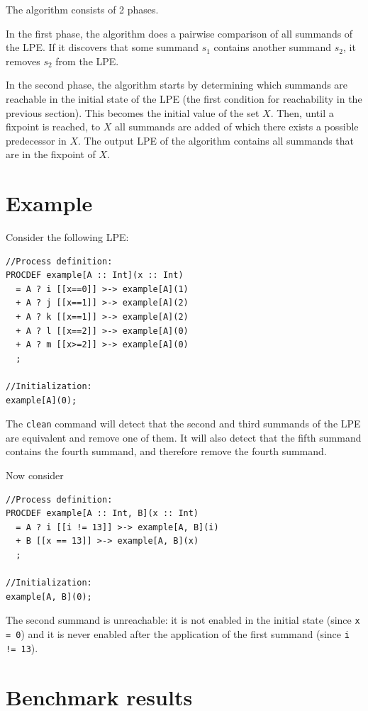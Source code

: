 The algorithm consists of 2 phases.

In the first phase, the algorithm does a pairwise comparison of all summands of the LPE.
If it discovers that some summand $s_1$ contains another summand $s_2$, it removes $s_2$ from the LPE.

In the second phase, the algorithm starts by determining which summands are reachable in the initial state of the LPE (the first condition for reachability in the previous section).
This becomes the initial value of the set $X$.
Then, until a fixpoint is reached, to $X$ all summands are added of which there exists a possible predecessor in $X$.
The output LPE of the algorithm contains all summands that are in the fixpoint of $X$.

\section{Example}

Consider the following LPE:

\begin{lstlisting}
//Process definition:
PROCDEF example[A :: Int](x :: Int)
  = A ? i [[x==0]] >-> example[A](1)
  + A ? j [[x==1]] >-> example[A](2)
  + A ? k [[x==1]] >-> example[A](2)
  + A ? l [[x==2]] >-> example[A](0)
  + A ? m [[x>=2]] >-> example[A](0)
  ;

//Initialization:
example[A](0);
\end{lstlisting}

The \texttt{clean} command will detect that the second and third summands of the LPE are equivalent and remove one of them.
It will also detect that the fifth summand contains the fourth summand, and therefore remove the fourth summand.

Now consider

\begin{lstlisting}
//Process definition:
PROCDEF example[A :: Int, B](x :: Int)
  = A ? i [[i != 13]] >-> example[A, B](i)
  + B [[x == 13]] >-> example[A, B](x)
  ;

//Initialization:
example[A, B](0);
\end{lstlisting}

The second summand is unreachable: it is not enabled in the initial state (since \texttt{x = 0}) and it is never enabled after the application of the first summand (since \texttt{i != 13}).

\section{Benchmark results}

